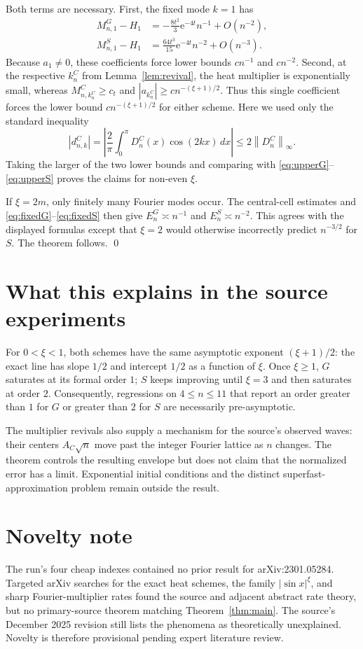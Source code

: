 \documentclass[11pt,a4paper]{article}
\newcommand{\e}{\mathrm e}
\newcommand{\norm}[1]{\left\lVert#1\right\rVert_\infty}
\begin{document}
Both terms are necessary.  First, the fixed mode $k=1$ has
\begin{align}
 M^G_{n,1}-H_1
 &=-\frac{8t^2}{3}\e^{-4t}n^{-1}+O(n^{-2}),\label{eq:fixedG}\\
 M^S_{n,1}-H_1
 &=\frac{64t^3}{15}\e^{-4t}n^{-2}+O(n^{-3}).\label{eq:fixedS}
\end{align}
Because $a_1\ne0$, these coefficients force lower bounds $cn^{-1}$ and
$cn^{-2}$.  Second, at the respective $k^C_n$ from
Lemma~\ref{lem:revival}, the heat multiplier is exponentially small, whereas
$M^C_{n,k^C_n}\ge c_t$ and
$|a_{k^C_n}|\ge c n^{-(\xi+1)/2}$.  Thus this single coefficient forces the
lower bound $cn^{-(\xi+1)/2}$ for either scheme.  Here we used only the
standard inequality
\[
 |d^C_{n,k}|=\left|\frac2\pi\int_0^\pi D^C_n(x)\cos(2kx)\,dx\right|
 \le2\norm{D^C_n}.
\]
Taking the larger of the two lower bounds and comparing with
\eqref{eq:upperG}--\eqref{eq:upperS} proves the claims for non-even $\xi$.

If $\xi=2m$, only finitely many Fourier modes occur.  The central-cell
estimates and \eqref{eq:fixedG}--\eqref{eq:fixedS} then give
$E^G_n\asymp n^{-1}$ and $E^S_n\asymp n^{-2}$.  This agrees with the displayed
formulas except that $\xi=2$ would otherwise incorrectly predict
$n^{-3/2}$ for $S$.  The theorem follows. \qed

\section*{What this explains in the source experiments}
For $0<\xi<1$, both schemes have the same asymptotic exponent
$(\xi+1)/2$: the exact line has slope $1/2$ and intercept $1/2$ as a function
of $\xi$.  Once $\xi\ge1$, $G$ saturates at its formal order $1$; $S$ keeps
improving until $\xi=3$ and then saturates at order $2$.  Consequently,
regressions on $4\le n\le11$ that report an order greater than $1$ for $G$ or
greater than $2$ for $S$ are necessarily pre-asymptotic.

The multiplier revivals also supply a mechanism for the source's observed
waves: their centers $A_C\sqrt n$ move past the integer Fourier lattice as
$n$ changes.  The theorem controls the resulting envelope but does not claim
that the normalized error has a limit.  Exponential initial conditions and
the distinct superfast-approximation problem remain outside the result.

\section*{Novelty note}
The run's four cheap indexes contained no prior result for arXiv:2301.05284.
Targeted arXiv searches for the exact heat schemes, the family
$|\sin x|^\xi$, and sharp Fourier-multiplier rates found the source and
adjacent abstract rate theory, but no primary-source theorem matching
Theorem~\ref{thm:main}.  The source's December 2025 revision still lists the
phenomena as theoretically unexplained.  Novelty is therefore provisional
pending expert literature review.
\end{document}
